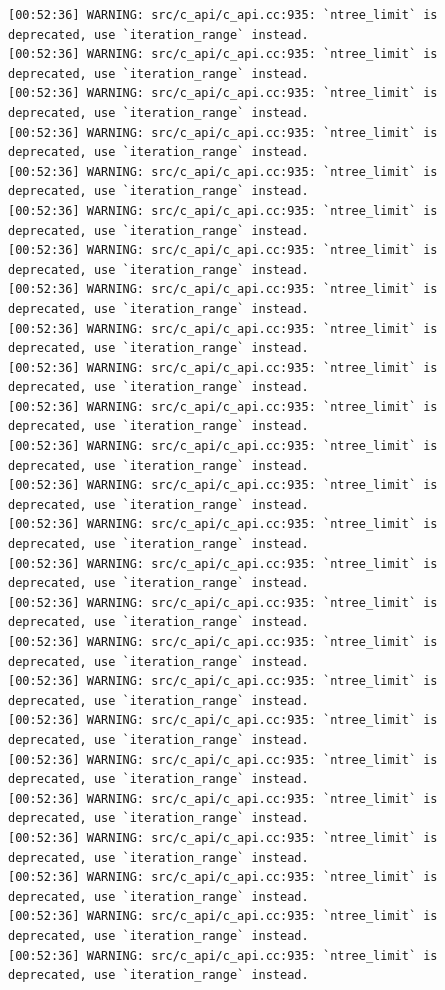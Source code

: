 \documentclass[
  letterpaper,
  DIV=11,
  numbers=noendperiod]{scrartcl}
\begin{document}
\begin{verbatim}
[00:52:36] WARNING: src/c_api/c_api.cc:935: `ntree_limit` is deprecated, use `iteration_range` instead.
[00:52:36] WARNING: src/c_api/c_api.cc:935: `ntree_limit` is deprecated, use `iteration_range` instead.
[00:52:36] WARNING: src/c_api/c_api.cc:935: `ntree_limit` is deprecated, use `iteration_range` instead.
[00:52:36] WARNING: src/c_api/c_api.cc:935: `ntree_limit` is deprecated, use `iteration_range` instead.
[00:52:36] WARNING: src/c_api/c_api.cc:935: `ntree_limit` is deprecated, use `iteration_range` instead.
[00:52:36] WARNING: src/c_api/c_api.cc:935: `ntree_limit` is deprecated, use `iteration_range` instead.
[00:52:36] WARNING: src/c_api/c_api.cc:935: `ntree_limit` is deprecated, use `iteration_range` instead.
[00:52:36] WARNING: src/c_api/c_api.cc:935: `ntree_limit` is deprecated, use `iteration_range` instead.
[00:52:36] WARNING: src/c_api/c_api.cc:935: `ntree_limit` is deprecated, use `iteration_range` instead.
[00:52:36] WARNING: src/c_api/c_api.cc:935: `ntree_limit` is deprecated, use `iteration_range` instead.
[00:52:36] WARNING: src/c_api/c_api.cc:935: `ntree_limit` is deprecated, use `iteration_range` instead.
[00:52:36] WARNING: src/c_api/c_api.cc:935: `ntree_limit` is deprecated, use `iteration_range` instead.
[00:52:36] WARNING: src/c_api/c_api.cc:935: `ntree_limit` is deprecated, use `iteration_range` instead.
[00:52:36] WARNING: src/c_api/c_api.cc:935: `ntree_limit` is deprecated, use `iteration_range` instead.
[00:52:36] WARNING: src/c_api/c_api.cc:935: `ntree_limit` is deprecated, use `iteration_range` instead.
[00:52:36] WARNING: src/c_api/c_api.cc:935: `ntree_limit` is deprecated, use `iteration_range` instead.
[00:52:36] WARNING: src/c_api/c_api.cc:935: `ntree_limit` is deprecated, use `iteration_range` instead.
[00:52:36] WARNING: src/c_api/c_api.cc:935: `ntree_limit` is deprecated, use `iteration_range` instead.
[00:52:36] WARNING: src/c_api/c_api.cc:935: `ntree_limit` is deprecated, use `iteration_range` instead.
[00:52:36] WARNING: src/c_api/c_api.cc:935: `ntree_limit` is deprecated, use `iteration_range` instead.
[00:52:36] WARNING: src/c_api/c_api.cc:935: `ntree_limit` is deprecated, use `iteration_range` instead.
[00:52:36] WARNING: src/c_api/c_api.cc:935: `ntree_limit` is deprecated, use `iteration_range` instead.
[00:52:36] WARNING: src/c_api/c_api.cc:935: `ntree_limit` is deprecated, use `iteration_range` instead.
[00:52:36] WARNING: src/c_api/c_api.cc:935: `ntree_limit` is deprecated, use `iteration_range` instead.
[00:52:36] WARNING: src/c_api/c_api.cc:935: `ntree_limit` is deprecated, use `iteration_range` instead.

\end{verbatim}
\end{document}
